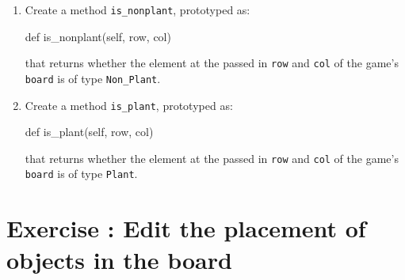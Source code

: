 \documentclass{42-en}
\begin{document}
\exnumber{\exercicenumber}

\makeheaderfiles
        \begin{enumerate}\itemsep7pt
    \item Create a method \texttt{is\_nonplant}, prototyped as:
\begin{42pycode}
def is_nonplant(self, row, col)
\end{42pycode}
    that returns whether the element at the passed in \texttt{row} and \texttt{col} of the game's \texttt{board} is of type \texttt{Non\_Plant}.
    \item Create a method \texttt{is\_plant}, prototyped as:
\begin{42pycode}
def is_plant(self, row, col)
\end{42pycode}
    that returns whether the element at the passed in \texttt{row} and \texttt{col} of the game's \texttt{board} is of type \texttt{Plant}.
    \end{enumerate}
\nextexercice
 \chapter{Exercise \exercicenumber: Edit the placement of objects in the board}

\exnumber{\exercicenumber}
\end{document}
